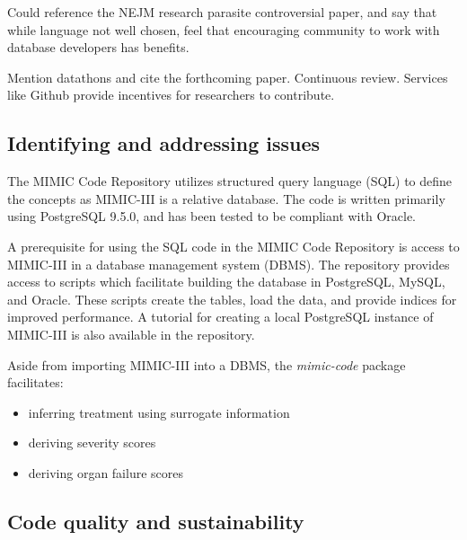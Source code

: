 \documentclass{bioinfo}
\begin{document}
\begin{methods}
Could reference the NEJM research parasite controversial paper, and say that while language not well chosen, feel that encouraging community to work with database developers has benefits.

Mention datathons and cite the forthcoming paper.  Continuous review. Services like Github provide incentives for researchers to contribute.

\subsection{Identifying and addressing issues}

The MIMIC Code Repository utilizes structured query language (SQL) to define the concepts as MIMIC-III  is a relative database. The code is written primarily using PostgreSQL 9.5.0, and has been tested to be compliant with Oracle.




A prerequisite for using the SQL code in the MIMIC Code Repository is access to MIMIC-III in a database management system (DBMS). The repository provides access to scripts which facilitate building the database in PostgreSQL, MySQL, and Oracle. These scripts create the tables, load the data, and provide indices for improved performance. A tutorial for creating a local PostgreSQL instance of MIMIC-III is also available in the repository.

Aside from importing MIMIC-III into a DBMS, the \emph{mimic-code} package facilitates:

\begin{itemize}
\item inferring treatment using surrogate information
\item deriving severity scores
\item deriving organ failure scores
\end{itemize}

\subsection{Code quality and sustainability}


\end{methods}
\end{document}
